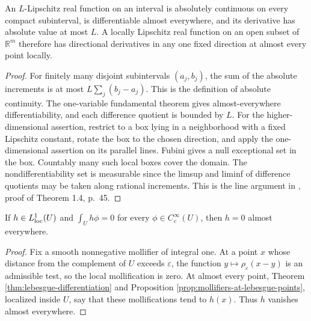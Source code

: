 \begin{lemma}\label{lem:lipschitz-on-lines}
An $L$-Lipschitz real function on an interval is absolutely continuous on every compact subinterval, is differentiable almost everywhere, and its derivative has absolute value at most $L$. A locally Lipschitz real function on an open subset of $\mathbb R^m$ therefore has directional derivatives in any one fixed direction at almost every point locally.
\end{lemma}
\begin{proof}
For finitely many disjoint subintervals $(a_j,b_j)$, the sum of the absolute increments is at most $L\sum_j(b_j-a_j)$. This is the definition of absolute continuity. The one-variable fundamental theorem gives almost-everywhere differentiability, and each difference quotient is bounded by $L$. For the higher-dimensional assertion, restrict to a box lying in a neighborhood with a fixed Lipschitz constant, rotate the box to the chosen direction, and apply the one-dimensional assertion on its parallel lines. Fubini gives a null exceptional set in the box. Countably many such local boxes cover the domain. The nondifferentiability set is measurable since the limsup and liminf of difference quotients may be taken along rational increments. This is the line argument in \cite{Sim18}, proof of Theorem 1.4, p.~45.
\end{proof}

\begin{lemma}\label{lem:zero-distribution-function}
If $h\in L^1_{\rm loc}(U)$ and $\int_Uh\phi=0$ for every $\phi\in C_c^\infty(U)$, then $h=0$ almost everywhere.
\end{lemma}
\begin{proof}
Fix a smooth nonnegative mollifier of integral one. At a point $x$ whose distance from the complement of $U$ exceeds $\varepsilon$, the function $y\mapsto\rho_\varepsilon(x-y)$ is an admissible test, so the local mollification is zero. At almost every point, Theorem \ref{thm:lebesgue-differentiation} and Proposition \ref{prop:mollifiers-at-lebesgue-points}, localized inside $U$, say that these mollifications tend to $h(x)$. Thus $h$ vanishes almost everywhere.
\end{proof}

